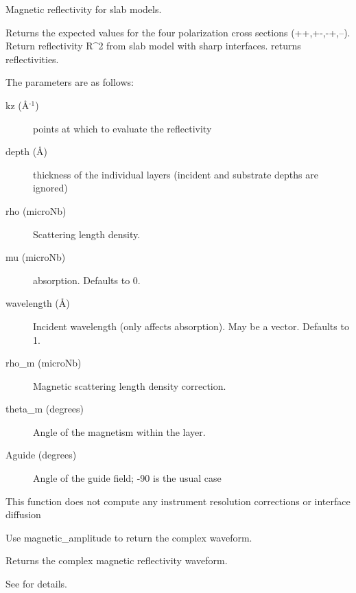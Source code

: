 \documentclass[letterpaper,10pt,english]{sphinxmanual}
\begin{document}
\begin{fulllineitems}
\label{api/reflectivity:refl1d.reflectivity.magnetic_reflectivity}
Magnetic reflectivity for slab models.

Returns the expected values for the four polarization cross
sections (++,+-,-+,--).
Return reflectivity R\textasciicircum{}2 from slab model with sharp interfaces.
returns reflectivities.

The parameters are as follows:
\begin{description}
\item[{kz (Å$^{\text{-1}}$)}] \leavevmode
points at which to evaluate the reflectivity

\item[{depth (Å)}] \leavevmode
thickness of the individual layers (incident and substrate
depths are ignored)

\item[{rho (microNb)}] \leavevmode
Scattering length density.

\item[{mu (microNb)}] \leavevmode
absorption. Defaults to 0.

\item[{wavelength (Å)}] \leavevmode
Incident wavelength (only affects absorption).  May be a vector.
Defaults to 1.

\item[{rho\_m (microNb)}] \leavevmode
Magnetic scattering length density correction.

\item[{theta\_m (degrees)}] \leavevmode
Angle of the magnetism within the layer.

\item[{Aguide (degrees)}] \leavevmode
Angle of the guide field; -90 is the usual case

\end{description}

This function does not compute any instrument resolution corrections
or interface diffusion

Use magnetic\_amplitude to return the complex waveform.

\end{fulllineitems}


\begin{fulllineitems}
\label{api/reflectivity:refl1d.reflectivity.magnetic_amplitude}
Returns the complex magnetic reflectivity waveform.

See {\hyperref[api/reflectivity:refl1d.reflectivity.magnetic_reflectivity]{}} for details.

\end{fulllineitems}
\end{document}
